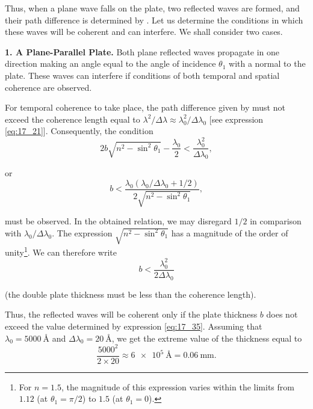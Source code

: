 Thus, when a plane wave falls on the plate, two reflected waves are formed, and their path difference is determined by .
Let us determine the conditions in which these waves will be coherent and can interfere.
We shall consider two cases.

\textbf{1. A Plane-Parallel Plate.}
Both plane reflected waves propagate in one direction making an angle equal to the angle of incidence $\theta_1$ with a normal to the plate.
These waves can interfere if conditions of both temporal and spatial coherence are observed.

For temporal coherence to take place, the path difference given by  must not exceed the coherence length equal to $\lambda^2/\Delta{\lambda}\approx\lambda_0^2/\Delta{\lambda_0}$ [see expression \eqref{eq:17_21}].
Consequently, the condition
\begin{equation*}
    2b \sqrt{n^2 - \sin^2\theta_1} - \frac{\lambda_0}{2} < \frac{\lambda_0^2}{\Delta{\lambda_0}},
\end{equation*}

\noindent
or
\begin{equation*}
    b < \frac{\lambda_0 (\lambda_0/\Delta{\lambda_0} + 1/2)}{2 \sqrt{n^2 - \sin^2\theta_1}},
\end{equation*}

\noindent
must be observed.
In the obtained relation, we may disregard $1/2$
in comparison with $\lambda_0/\Delta{\lambda_0}$.
The expression $\sqrt{n^2-\sin^2\theta_1}$ has a magnitude of the order of unity\footnote{For $n=1.5$, the magnitude of this expression varies within the limits from $1.12$ (at $\theta_1=\pi/2$) to $1.5$ (at $\theta_1=0$).}.
We can therefore write
\begin{equation}\label{eq:17_35}
    b < \frac{\lambda_0^2}{2 \Delta{\lambda_0}}
\end{equation}

\noindent
(the double plate thickness must be less than the coherence length).

Thus, the reflected waves will be coherent only if the plate thickness $b$ does not exceed the value determined by expression \eqref{eq:17_35}.
Assuming that $\lambda_0=\SI{5000}{\angstrom}$ and $\Delta{\lambda_0}=\SI{20}{\angstrom}$, we get the extreme value of the thickness equal to
\begin{equation}\label{eq:17_36}
    \frac{5000^2}{2 \times 20} \approx \SI{6e5}{\angstrom} = \SI{0.06}{\milli\metre}.
\end{equation}

